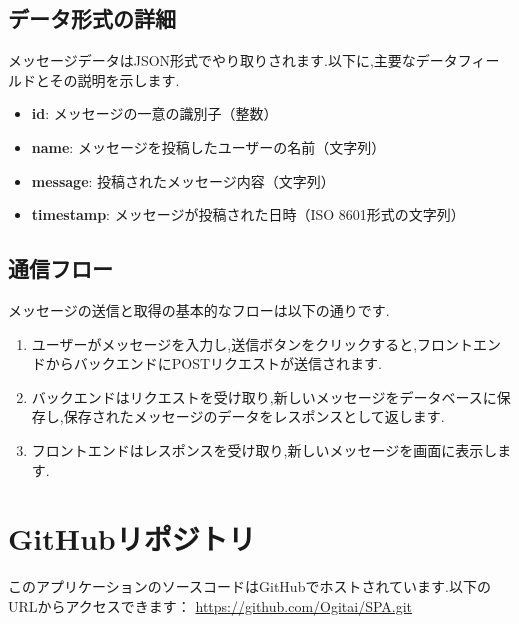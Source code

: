 \documentclass[uplatex,dvipdfmx]{jsarticle}
\begin{document}
\subsection{データ形式の詳細}
メッセージデータはJSON形式でやり取りされます.以下に,主要なデータフィールドとその説明を示します.
\begin{itemize}
    \item \textbf{id}: メッセージの一意の識別子（整数）
    \item \textbf{name}: メッセージを投稿したユーザーの名前（文字列）
    \item \textbf{message}: 投稿されたメッセージ内容（文字列）
    \item \textbf{timestamp}: メッセージが投稿された日時（ISO 8601形式の文字列）
\end{itemize}

\subsection{通信フロー}
メッセージの送信と取得の基本的なフローは以下の通りです.
\begin{enumerate}
    \item ユーザーがメッセージを入力し,送信ボタンをクリックすると,フロントエンドからバックエンドにPOSTリクエストが送信されます.
    \item バックエンドはリクエストを受け取り,新しいメッセージをデータベースに保存し,保存されたメッセージのデータをレスポンスとして返します.
    \item フロントエンドはレスポンスを受け取り,新しいメッセージを画面に表示します.
\end{enumerate}

\section{GitHubリポジトリ}
このアプリケーションのソースコードはGitHubでホストされています.以下のURLからアクセスできます：
\url{https://github.com/Ogitai/SPA.git}
\end{document}
